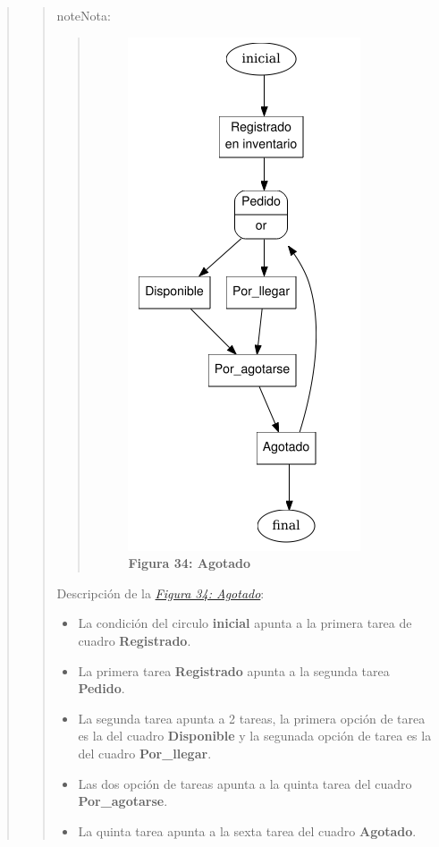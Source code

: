 \documentclass[letterpaper,11pt,spanish]{sphinxmanual}
\begin{document}
\begin{quote}
\begin{quote}
\begin{notice}{note}{Nota:}
\begin{quote}
\begin{figure}[htbp]
\includegraphics{grafo_inflow7.png}
\caption{\textbf{Figura 34: Agotado}}\label{_templates/Contenido6/Parte4:figura34}\end{figure}
\end{quote}

Descripción de la {\hyperref[_templates/Contenido6/Parte4:figura34]{\emph{Figura 34: Agotado}}}:
\begin{itemize}
\item {} 
La condición del circulo \textbf{inicial} apunta a la primera tarea de cuadro \textbf{Registrado}.

\item {} 
La primera tarea \textbf{Registrado} apunta a la segunda tarea \textbf{Pedido}.

\item {} 
La segunda tarea apunta a 2 tareas, la primera opción de tarea es la del cuadro \textbf{Disponible} y la segunada opción de tarea es la del cuadro \textbf{Por\_llegar}.

\item {} 
Las dos opción de tareas apunta a la quinta tarea del cuadro \textbf{Por\_agotarse}.

\item {} 
La quinta tarea apunta a la sexta tarea del cuadro \textbf{Agotado}.


\end{itemize}
\end{notice}
\end{quote}
\end{quote}
\end{document}
